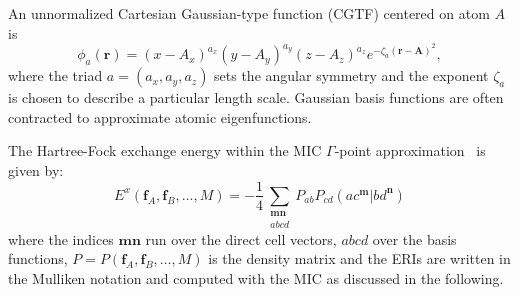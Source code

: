 \documentclass[prl,preprint,doublespace]{revtex4} %
\def\Tr{{\rm Tr}}
\begin{document}
An unnormalized Cartesian Gaussian-type function (CGTF) centered on atom $A$ is
\begin{equation*}
  \phi_a(\mathbf{r})=(x-A_x)^{a_x}(y-A_y)^{a_y}(z-A_z)^{a_z}e^{-\zeta_a(\mathbf{r-A})^2},
\end{equation*}
where the triad $a=(a_x,a_y,a_z)$ sets the angular symmetry and the exponent $\zeta_a$
is chosen to describe a particular length scale. Gaussian basis functions are often
contracted to approximate atomic eigenfunctions.


The Hartree-Fock exchange energy within the MIC $\Gamma$-point approximation~\cite{CTymczak04b} 
is given by:
\begin{equation*}
E^x(\mathbf{f}_A,\mathbf{f}_B,\ldots,M)=
 -\frac{1}{4}\sum_{\substack{\mathbf{m}\mathbf{n}\\a b c d}}P_{ab}P_{cd}
 (ac^\mathbf{m}|bd^\mathbf{n})
\end{equation*}
where the indices $\mathbf{mn}$ run over the direct cell vectors, 
$abcd$ over the basis functions, 
$P=P(\mathbf{f}_A,\mathbf{f}_B,\ldots,M)$
is the density matrix 
and the ERIs are written in the Mulliken notation and computed 
with the MIC as discussed in the following.
\end{document}
